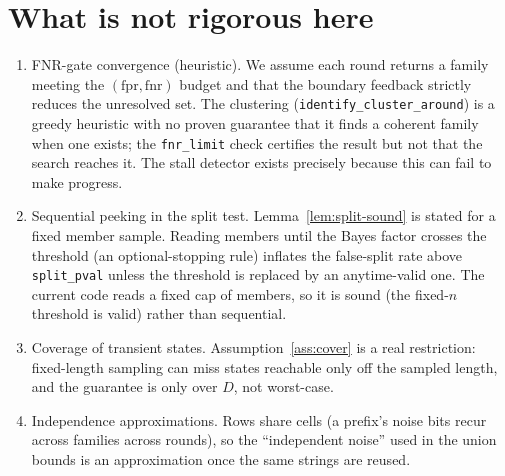 \section{What is not rigorous here}

\begin{enumerate}
\item FNR-gate convergence (heuristic). We assume each round returns a
family meeting the $(\mathrm{fpr},\mathrm{fnr})$ budget and that the boundary
feedback strictly reduces the unresolved set. The clustering
(\texttt{identify\_cluster\_around}) is a greedy heuristic with no proven
guarantee that it finds a coherent family when one exists; the \texttt{fnr\_limit}
check certifies the result but not that the search reaches it. The stall
detector exists precisely because this can fail to make progress.

\item Sequential peeking in the split test. Lemma~\ref{lem:split-sound}
is stated for a fixed member sample. Reading members until the Bayes factor
crosses the threshold (an optional-stopping rule) inflates the false-split rate
above \texttt{split\_pval} unless the threshold is replaced by an anytime-valid
one. The current code reads a fixed cap of members, so it is sound (the fixed-$n$
threshold is valid) rather than sequential.

\item Coverage of transient states. Assumption~\ref{ass:cover} is a real
restriction: fixed-length sampling can miss states reachable only off the sampled
length, and the guarantee is only over $D$, not worst-case.

\item Independence approximations. Rows share cells (a prefix's noise
bits recur across families across rounds), so the ``independent noise'' used in
the union bounds is an approximation once the same strings are reused.
\end{enumerate}
